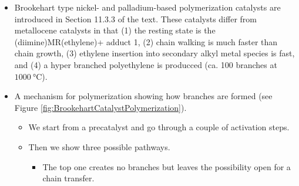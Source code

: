 \documentclass[../notes.tex]{subfiles}
\begin{document}
\begin{itemize}
\begin{figure}[h!]
            [-90]
            [180,2.2]
            [180,1.3]
            [90,1.9]
        \schemestop
        \caption{Wacker oxidation mechanism (for an alcohol).}
        \label{fig:mechanism-WackerOxidationAlcohol}
    \end{figure}
    \begin{itemize}
        \item Look back at the traditional mechanism but be aware of such derivatives. Know the similarities. The starting material should drive you toward the product.
        \item Does it matter when the ligands are being lost and coordinated.
        \begin{itemize}
            \item Not really.
            \item Anderson's way is probably a bit more realistic.
        \end{itemize}
    \end{itemize}
    \item Brookehart type nickel- and palladium-based polymerization catalysts are introduced in Section 11.3.3 of the text. These catalysts differ from metallocene catalysts in that (1) the resting state is the (diimine)MR(ethylene)+ adduct 1, (2) chain walking is much faster than chain growth, (3) ethylene insertion into secondary alkyl metal species is fast, and (4) a hyper branched polyethylene is producced (ca. 100 branches at $\SI{1000}{\celsius}$).
    \item A mechanism for polymerization showing how branches are formed (see Figure \ref{fig:BrookehartCatalystPolymerization}).
    \begin{itemize}
        \item We start from a precatalyst and go through a couple of activation steps.
        \item Then we show three possible pathways.
        \begin{itemize}
            \item The top one creates no branches but leaves the possibility open for a chain transfer.

\end{itemize}
\end{itemize}
\end{itemize}
\end{document}
